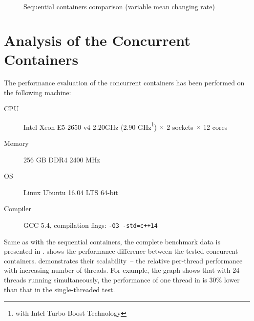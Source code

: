 \begin{figure}[!t]
\centering
    \label{f3}
\caption{Sequential containers comparison (variable mean changing rate)}
\end{figure}


\section{Analysis of the Concurrent Containers}

\label{sec:conanalysis}

The performance evaluation of the concurrent containers has been performed on the following machine:

\begin{description}
    \item [CPU] Intel\textsuperscript{\textregistered{}} Xeon\textsuperscript{\textregistered{}} E5-2650 v4
    2.20GHz (2.90 GHz\footnote{with Intel\textsuperscript{\textregistered{}} Turbo Boost Technology}) $ \times $ 2 sockets $ \times $ 12 cores
    \item [Memory] 256 GB DDR4 2400 MHz
    \item [OS] Linux\textsuperscript{\textregistered{}} Ubuntu\textsuperscript{\textregistered{}} 16.04 LTS 64-bit
    \item [Compiler] GCC 5.4, compilation flags: \texttt{-O3 -std=c++14}
    \end{description}

Same as with the sequential containers, the complete benchmark data is presented in .  shows the performance difference between the tested concurrent containers.  demonstrates their scalability~-- the relative per-thread performance with increasing number of threads. For example, the graph shows that with 24 threads running simultaneously, the performance of one thread in \cndcname is 30\% lower than that in the single-threaded test.

